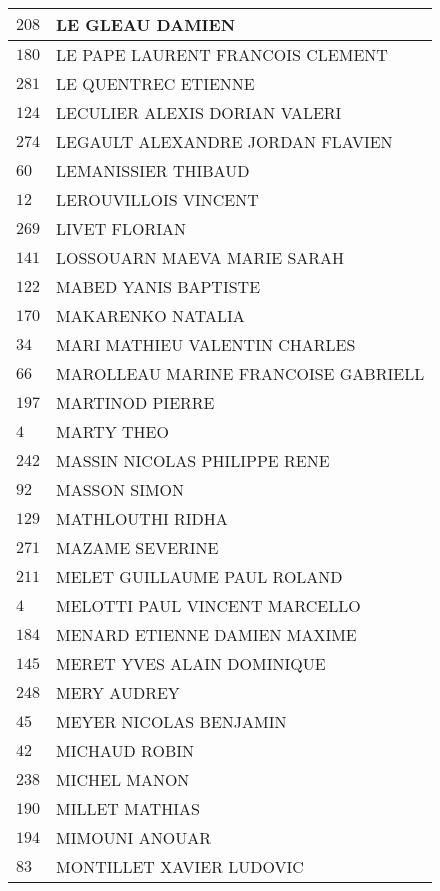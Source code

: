 \begin{xltabular}{\linewidth}{|l|X|}
    \hline
    $208$ & LE GLEAU DAMIEN \\
    \hline
    $180$ & LE PAPE LAURENT FRANCOIS CLEMENT \\
    \hline
    $281$ & LE QUENTREC ETIENNE \\
    \hline
    $124$ & LECULIER ALEXIS DORIAN VALERI \\
    \hline
    $274$ & LEGAULT ALEXANDRE JORDAN FLAVIEN \\
    \hline
    $60$ & LEMANISSIER THIBAUD \\
    \hline
    $12$ & LEROUVILLOIS VINCENT \\
    \hline
    $269$ & LIVET FLORIAN \\
    \hline
    $141$ & LOSSOUARN MAEVA MARIE SARAH \\
    \hline
    $122$ & MABED YANIS BAPTISTE \\
    \hline
    $170$ & MAKARENKO NATALIA \\
    \hline
    $34$ & MARI MATHIEU VALENTIN CHARLES \\
    \hline
    $66$ & MAROLLEAU MARINE FRANCOISE GABRIELL \\
    \hline
    $197$ & MARTINOD PIERRE \\
    \hline
    $4$ & MARTY THEO \\
    \hline
    $242$ & MASSIN NICOLAS PHILIPPE RENE \\
    \hline
    $92$ & MASSON SIMON \\
    \hline
    $129$ & MATHLOUTHI RIDHA \\
    \hline
    $271$ & MAZAME SEVERINE \\
    \hline
    $211$ & MELET GUILLAUME PAUL ROLAND \\
    \hline
    $4$ & MELOTTI PAUL VINCENT MARCELLO \\
    \hline
    $184$ & MENARD ETIENNE DAMIEN MAXIME \\
    \hline
    $145$ & MERET YVES ALAIN DOMINIQUE \\
    \hline
    $248$ & MERY AUDREY \\
    \hline
    $45$ & MEYER NICOLAS BENJAMIN \\
    \hline
    $42$ & MICHAUD ROBIN \\
    \hline
    $238$ & MICHEL MANON \\
    \hline
    $190$ & MILLET MATHIAS \\
    \hline
    $194$ & MIMOUNI ANOUAR \\
    \hline
    $83$ & MONTILLET XAVIER LUDOVIC \\

\end{xltabular}
